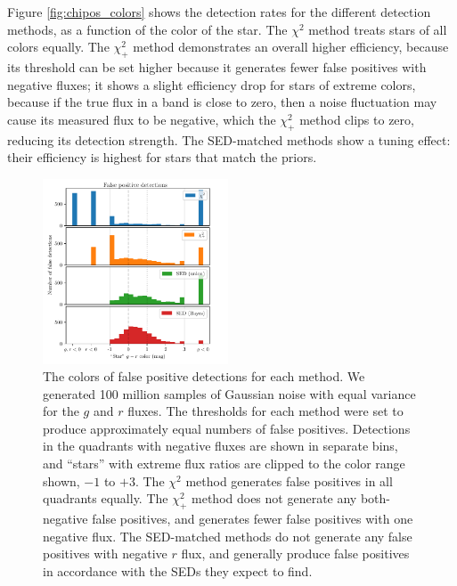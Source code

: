 \documentclass[11pt,letterpaper,linenumbers]{aastex63}
\newcommand{\chipos}{\chi_+}
\begin{document}
Figure \ref{fig:chipos_colors} shows the detection rates for the
different detection methods, as a function of the color of the star.
The $\chi^2$ method treats stars of all colors equally.  The
$\chipos^2$ method demonstrates an overall higher efficiency, because
its threshold can be set higher because it generates fewer false
positives with negative fluxes; it shows a slight efficiency drop for
stars of extreme colors, because if the true flux in a band is close
to zero, then a noise fluctuation may cause its measured flux to be
negative, which the $\chipos^2$ method clips to zero, reducing its
detection strength.  The SED-matched methods show a tuning effect:
their efficiency is highest for stars that match the priors.

\begin{figure}
  \begin{center}
    \includegraphics[width=0.49\textwidth]{chisq-false-det}%
  \end{center}
  \caption{The colors of false positive detections for each method.
    We generated 100 million samples of Gaussian noise with equal
    variance for the $g$ and $r$ fluxes.  The thresholds for each
    method were set to produce approximately equal numbers of false
    positives.  Detections in the quadrants with negative fluxes are
    shown in separate bins, and ``stars'' with extreme flux ratios are
    clipped to the color range shown, $-1$ to $+3$.  The $\chi^2$
    method generates false positives in all quadrants equally.  The
    $\chipos^2$ method does not generate any both-negative false
    positives, and generates fewer false positives with one negative
    flux.  The SED-matched methods do not generate any false positives
    with negative $r$ flux, and generally produce false positives in
    accordance with the SEDs they expect to find.
  \label{fig:chipos_false}}
\end{figure}
\end{document}
